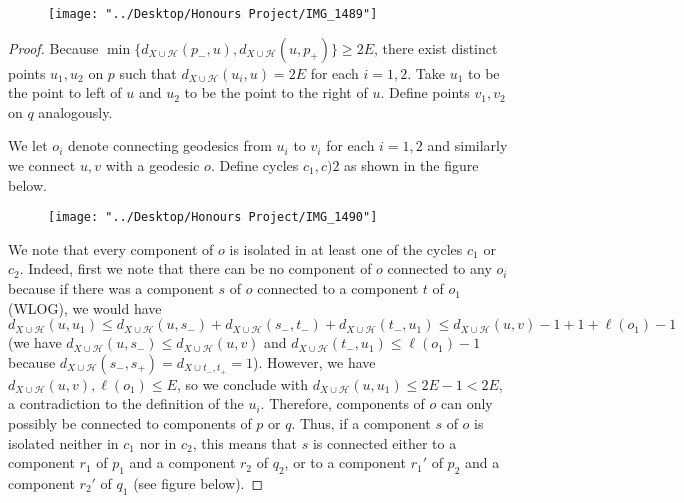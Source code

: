 \documentclass[12pt]{article}
\newcommand{\vs}{\vskip10pt}
\begin{document}
\begin{figure}
	\centering
	\texttt{[image: "../Desktop/Honours Project/IMG\_1489"]}
	\caption{}
	\label{fig:img1489}
\end{figure}
	
	
	\begin{proof}
		
		Because $\min \{d_{X \cup \mathcal{H}}(p_{-}, u), d_{X \cup \mathcal{H}}(u, p_{+})\} \geq 2 E$, there exist distinct points $u_1, u_2$ on $p$ such that $d_{X \cup \mathcal{H}}(u_i, u) = 2 E$ for each $i = 1,2$. Take $u_1$ to be the point to left of $u$ and $u_2$ to be the point to the right of $u$. Define points $v_1, v_2$ on $q$ analogously. 
		
		\vs 
		
		We let $o_i$ denote connecting geodesics from $u_i$ to $v_i$ for each $i = 1,2$ and similarly we connect $u,v$ with a geodesic $o$. Define cycles $c_1, c)2$ as shown in the figure below. 
		
\begin{figure}
	\centering
	\texttt{[image: "../Desktop/Honours Project/IMG\_1490"]}
	\caption{}
	\label{fig:img1490}
\end{figure}
		
		We note that every component of $o$ is isolated in at least one of the cycles $c_1$ or $c_2$. Indeed, first we note that there can be no component of $o$ connected to any $o_i$ because if there was a component $s$ of $o$ connected to a component $t$ of $o_1$ (WLOG), we would have $d_{X \cup \mathcal{H}}(u,u_1) \leq d_{X \cup \mathcal{H}}(u, s_{-}) + d_{X \cup \mathcal{H}} (s_{-}, t_{-}) + d_{X \cup \mathcal{H}} (t_{-}, u_1) \leq d_{X \cup \mathcal{H}} (u,v) - 1 + 1 + \ell(o_1) - 1$ (we have $d_{X \cup \mathcal{H}} (u, s_{-}) \leq d_{X \cup \mathcal{H}} (u,v)$ and $d_{X \cup \mathcal{H}} (t_{-}, u_1) \leq \ell(o_1) - 1$ because $d_{X \cup \mathcal{H}} (s_{-}, s_{+}) = d_{X \cup t_{-}, t_{+}} = 1$). However, we have $d_{X \cup \mathcal{H}}(u,v), \ell(o_1) \leq E$, so we conclude with $d_{X \cup \mathcal{H}} (u,u_1) \leq 2E -1 < 2E$, a contradiction to the definition of the $u_i$. Therefore, components of $o$ can only possibly be connected to components of $p$ or $q$. Thus, if a component $s$ of $o$ is isolated neither in $c_1$ nor in $c_2$, this means that $s$ is connected either to a component $r_1$ of $p_1$ and a component $r_2$ of $q_2$, or to a component $r_1'$ of $p_2$ and a component $r_2'$ of $q_1$ (see figure below).
		

\end{proof}
\end{document}
